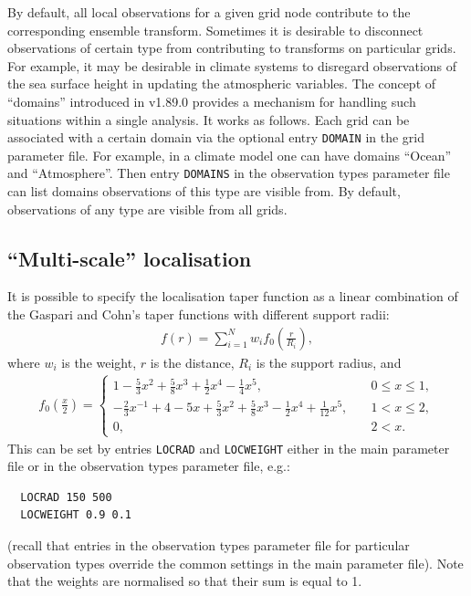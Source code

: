 \documentclass[11pt]{report}
\begin{document}
By default, all local observations for a given grid node contribute to the corresponding ensemble transform.
Sometimes it is desirable to disconnect observations of certain type from contributing to transforms on particular grids.
For example, it may be desirable in climate systems to disregard observations of the sea surface height in updating the atmospheric variables.
The concept of ``domains'' introduced in v1.89.0 provides a mechanism for handling such situations within a single analysis.
It works as follows.
Each grid can be associated with a certain domain via the optional entry \verb|DOMAIN| in the grid parameter file.
For example, in a climate model one can have domains ``Ocean'' and ``Atmosphere''.
Then entry \verb|DOMAINS| in the observation types parameter file can list domains observations of this type are visible from.
By default, observations of any type are visible from all grids.

\subsection {``Multi-scale'' localisation}

It is possible to specify the localisation taper function as a linear combination of the Gaspari and Cohn's taper functions with different support radii:
\begin{align*}
  f(r) = \sum_{i=1}^N w_i f_0(\frac{r}{R_i}),
\end{align*}
where $w_i$ is the weight, $r$ is the distance, $R_i$ is the support radius, and
\begin{align*}
  f_0(\frac{x}{2}) = \left\{
  \begin{array}{ll}
    1 - \frac{5}{3} x^2 + \frac{5}{8} x^3 + \frac{1}{2} x^4 -\frac{1}{4} x^5, \quad & 0 \le x \le 1,\\
    -\frac{2}{3} x^{-1} + 4 - 5x + \frac{5}{3}x^2 + \frac{5}{8}x^3 - \frac{1}{2} x^4 + \frac{1}{12}x^5, \quad & 1 < x \le 2,\\
    0, \quad & 2 < x.
  \end{array}
  \right.
\end{align*}
This can be set by entries \verb|LOCRAD| and \verb|LOCWEIGHT| either in the main parameter file or in the observation types parameter file, e.g.:
\begin{Verbatim}
  LOCRAD 150 500
  LOCWEIGHT 0.9 0.1
\end{Verbatim}
(recall that entries in the observation types parameter file for particular observation types override the common settings in the main parameter file).
Note that the weights are normalised so that their sum is equal to 1.
\end{document}

